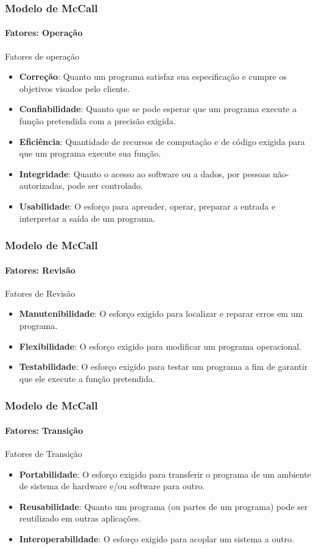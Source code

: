 \begin{frame}
	\frametitle{Modelo de McCall}
	\framesubtitle{Fatores: Operação}
	
	\begin{block:concept}{Fatores de operação}
		\begin{itemize}
			\item \textbf{Correção}: Quanto um programa satisfaz sua especificação e cumpre os
			objetivos visados pelo cliente.
			\item \textbf{Confiabilidade}: Quanto que se pode esperar que um programa execute a
			função pretendida com a precisão exigida.
			\item \textbf{Eficiência}: Quantidade de recursos de computação e de código exigida
			para que um programa execute sua função.
			\item \textbf{Integridade}: Quanto o acesso ao software ou a dados, por pessoas
			não-autorizadas, pode ser controlado.
			\item \textbf{Usabilidade}: O esforço para aprender, operar, preparar a entrada e
			interpretar a saída de um programa.
		\end{itemize}
	\end{block:concept}
\end{frame}

\begin{frame}
	\frametitle{Modelo de McCall}
	\framesubtitle{Fatores: Revisão}

	\begin{block:concept}{Fatores de Revisão}
		\begin{itemize}
			\item \textbf{Manutenibilidade}: O esforço exigido para localizar e reparar erros
			em um programa.
			\item \textbf{Flexibilidade}: O esforço exigido para modificar um programa
			operacional.
			\item \textbf{Testabilidade}: O esforço exigido para testar um programa a fim de
			garantir que ele execute a função pretendida.
		\end{itemize}
	\end{block:concept}
\end{frame}


\begin{frame}
	\frametitle{Modelo de McCall}
	\framesubtitle{Fatores: Transição}

	\begin{block:concept}{Fatores de Transição}
		\begin{itemize}
			\item \textbf{Portabilidade}: O esforço exigido para transferir o programa de um
			ambiente de sistema de hardware e/ou software para outro.
			\item \textbf{Reusabilidade}: Quanto um programa (ou partes de um programa) pode 
			ser reutilizado em outras aplicações.
			\item \textbf{Interoperabilidade}: O esforço exigido para acoplar um sistema a
			outro.
		\end{itemize}
	\end{block:concept}
\end{frame}


